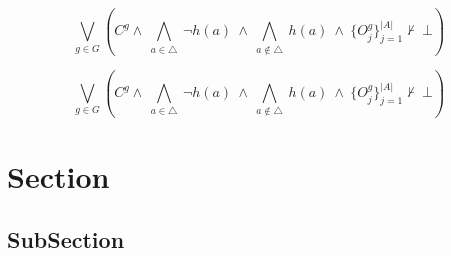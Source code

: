 \documentclass[a4paper]{article}
\begin{document}
\[\bigvee_{g\in G} (C^g \wedge\ \bigwedge_{a\in \triangle}\ \neg h(a)\ \wedge\ \bigwedge_{a\notin \triangle}\ h(a)\ \wedge\ \{O_j^g\}_{j=1}^{|A|} \nvdash\ \bot )\]

\[\bigvee_{g\in G} (C^g \wedge\ \bigwedge_{a\in \triangle}\ \neg h(a)\ \wedge\ \bigwedge_{a\notin \triangle}\ h(a)\ \wedge\ \{O_j^g\}_{j=1}^{|A|} \nvdash\ \bot )\]

\section{Section}

\subsection{SubSection}
\end{document}
